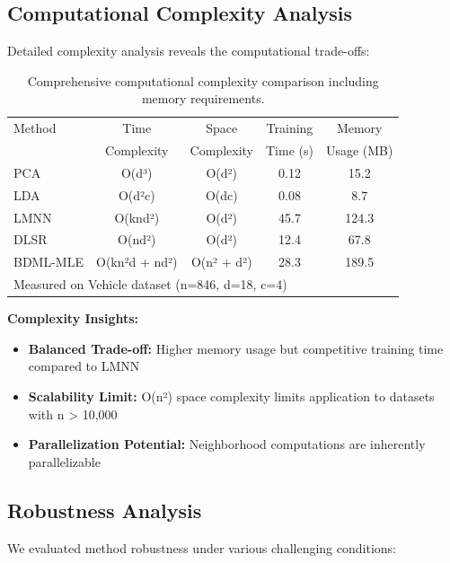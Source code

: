 \documentclass[review]{elsarticle}
\begin{document}
\subsection{Computational Complexity Analysis}

Detailed complexity analysis reveals the computational trade-offs:

\begin{table}[htbp]
\centering
\caption{Comprehensive computational complexity comparison including memory requirements.}
\label{tab:complexity_analysis}
\begin{tabular}{l|cc|cc}
\toprule
Method & Time & Space & Training & Memory \\
 & Complexity & Complexity & Time (s) & Usage (MB) \\
\midrule
PCA & O(d³) & O(d²) & 0.12 & 15.2 \\
LDA & O(d²c) & O(dc) & 0.08 & 8.7 \\
LMNN & O(knd²) & O(d²) & 45.7 & 124.3 \\
DLSR & O(nd²) & O(d²) & 12.4 & 67.8 \\
\midrule
BDML-MLE & O(kn²d + nd²) & O(n² + d²) & 28.3 & 189.5 \\
\midrule
\multicolumn{5}{l}{Measured on Vehicle dataset (n=846, d=18, c=4)} \\
\bottomrule
\end{tabular}
\end{table}

\textbf{Complexity Insights:}
\begin{itemize}
\item \textbf{Balanced Trade-off:} Higher memory usage but competitive training time compared to LMNN
\item \textbf{Scalability Limit:} O(n²) space complexity limits application to datasets with n > 10,000
\item \textbf{Parallelization Potential:} Neighborhood computations are inherently parallelizable
\end{itemize}

\subsection{Robustness Analysis}

We evaluated method robustness under various challenging conditions:
\end{document}
